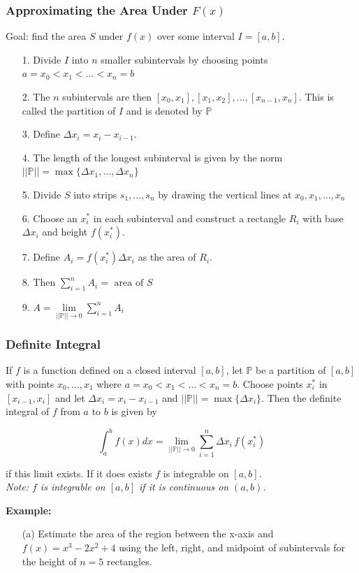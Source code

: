 \documentclass{beamer}
\begin{document}
\begin{frame}
\frametitle{\textbf{Approximating the Area Under $F(x)$}}
Goal: find the area $S$ under $f(x)$ over some interval $I=[a,b]$.
\begin{itemize}
	\item[1.] Divide $I$ into $n$ smaller subintervals by choosing points $a=x_0<x_1<...<x_n=b$
	\item[2.] The $n$ subintervals are then $[x_0,x_1],[x_1,x_2],...,[x_{n-1},x_n]$. This is called the partition of $I$ and is denoted by $\mathbb{P}$
	\item[3.] Define $\Delta x_i = x_i-x_{i-1}$.
	\item[4.] The length of the longest subinterval is given by the norm $||\mathbb{P}|| = \max\{\Delta x_1,...,\Delta x_n\}$
	\item[5.] Divide $S$ into strips $s_1,...,s_n$ by drawing the vertical lines at $x_0,x_1,...,x_n$
	\item[6.] Choose an $x_i^*$ in each subinterval and construct a rectangle $R_i$ with base $\Delta x_i$ and height $f(x_i^*)$.
	\item[7.] Define $A_i = f(x_i^*) \Delta x_i$ as the area of $R_i$.
	\item[8.] Then $\sum_{i=1}^{n} A_i = \mbox{ area of } S$
	\item[9.] $A = \lim\limits_{||\mathbb{P}|| \to 0} \sum_{i=1}^{n} A_i$
\end{itemize}


\end{frame}

\begin{frame}
\frametitle{\textbf{Definite Integral}}
If $f$ is a function defined on a closed interval $[a,b]$, let $\mathbb{P}$ be a partition of $[a,b]$ with points $x_0,...,x_1$ where $a=x_0<x_1<...<x_n=b$. Choose points $x_i^*$ in $[x_{i-1},x_i]$ and let $\Delta x_i = x_i - x_{i-1}$ and $||\mathbb{P}|| = \max\{ \Delta x_i \}$. Then the definite integral of $f$ from $a$ to $b$ is given by

$$\int_{a}^{b} f(x)dx =  \lim\limits_{||\mathbb{P}|| \to 0} \sum_{i=1}^{n} \Delta x_i \, f(x_i^*)$$

if this limit exists. If it does exists $f$ is integrable on $[a,b]$.\\

\vspace{6pt}
\textit{Note: $f$ is integrable on $[a,b]$ if it is continuous on $(a,b)$.}

\vspace{6pt}
\textbf{Example:}
\begin{itemize}
	\item[(a)] Estimate the area of the region between the x-axis and $f(x) = x^3-2x^2+4$ using the left, right, and midpoint of subintervals for the height of $n=5$ rectangles.
\end{itemize}

\end{frame}
\end{document}
